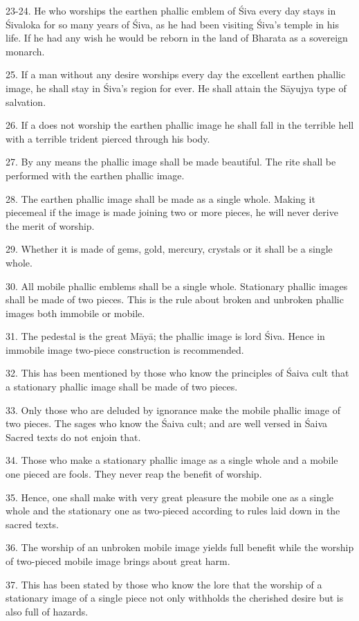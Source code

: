 23-24. He who worships the earthen phallic emblem of Śiva every day stays in
Śivaloka for so many years of Śiva, as he had been visiting Śiva’s temple in his
life. If he had any wish he would be reborn in the land of Bharata as
a sovereign monarch.

25. If a man without any desire worships every day the excellent earthen phallic
image, he shall stay in Śiva’s region for ever. He shall attain the Sāyujya type
of salvation.

26. If a  does not worship the earthen phallic image he shall fall
in the terrible hell with a terrible trident pierced through his body.

27. By any means the phallic image shall be made beautiful. The 
rite shall be performed with the earthen phallic image.

28. The earthen phallic image shall be made as a single whole. Making it
piecemeal \ie if the image is made joining two or more pieces, he will never
derive the merit of worship.

29. Whether it is made of gems, gold, mercury, crystals or  it
shall be a single whole.

30. All mobile phallic emblems shall be a single whole. Stationary phallic
images shall be made of two pieces. This is the rule about broken and unbroken
phallic images both immobile or mobile.

31. The pedestal is the great Māyā; the phallic image is lord Śiva. Hence in
immobile image two-piece construction is recommended.

32. This has been mentioned by those who know the principles of Śaiva cult that
a stationary phallic image shall be made of two pieces.

33. Only those who are deluded by ignorance make the mobile phallic image of
two pieces. The sages who know the Śaiva cult; and are well versed in Śaiva
Sacred texts do not enjoin that.

34. Those who make a stationary phallic image as a single whole and a mobile one
pieced are fools. They never reap the benefit of worship.

35. Hence, one shall make with very great pleasure the mobile one as a single
whole and the stationary one as two-pieced according to rules laid down in
the sacred texts.

36. The worship of an unbroken mobile image yields full benefit while
the worship of two-pieced mobile image brings about great harm.

37. This has been stated by those who know the lore that the worship of
a stationary image of a single piece not only withholds the cherished desire but
is also full of hazards.
